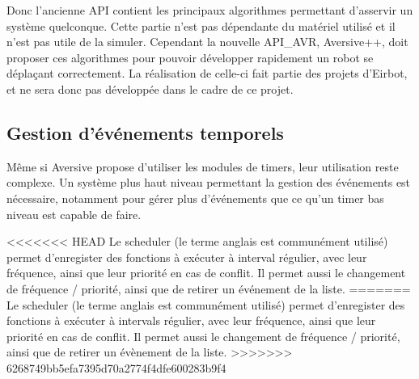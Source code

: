 Donc l'ancienne API contient les principaux algorithmes permettant d'asservir un système quelconque. Cette partie n'est pas dépendante du matériel utilisé et il n'est pas utile de la simuler. 
Cependant la nouvelle API_AVR, Aversive++,  doit proposer ces algorithmes pour pouvoir développer rapidement un robot se déplaçant correctement. La réalisation de celle-ci fait partie des projets d'Eirbot, et ne sera donc pas développée dans le cadre de ce projet.


\subsection{Gestion d'événements temporels}

Même si Aversive propose d'utiliser les modules de timers, leur utilisation reste complexe. Un système plus haut niveau permettant la gestion des événements est nécessaire, notamment pour gérer plus d'événements que ce qu'un timer bas niveau est capable de faire.

<<<<<<< HEAD
Le scheduler (le terme anglais est communément utilisé) permet d'enregister des fonctions à exécuter à interval régulier, avec leur fréquence, ainsi que leur priorité en cas de conflit. Il permet aussi le changement de fréquence / priorité, ainsi que de retirer un événement de la liste.
=======
Le scheduler (le terme anglais est communément utilisé) permet d'enregister des fonctions à exécuter à intervals régulier, avec leur fréquence, ainsi que leur priorité en cas de conflit. Il permet aussi le changement de fréquence / priorité, ainsi que de retirer un évènement de la liste.
>>>>>>> 6268749bb5efa7395d70a2774f4dfe600283b9f4
\clearpage
